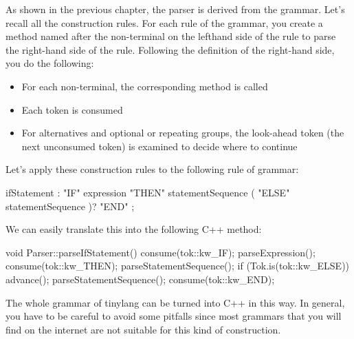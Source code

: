 As shown in the previous chapter, the parser is derived from the grammar. Let’s recall all the construction rules. For each rule of the grammar, you create a method named after the non-terminal on the lefthand side of the rule to parse the right-hand side of the rule. Following the definition of the right-hand side, you do the following:

\begin{itemize}
\item
For each non-terminal, the corresponding method is called

\item
Each token is consumed

\item
For alternatives and optional or repeating groups, the look-ahead token (the next unconsumed token) is examined to decide where to continue
\end{itemize}

Let’s apply these construction rules to the following rule of grammar:

\begin{shell}
ifStatement
    : "IF" expression "THEN" statementSequence
        ( "ELSE" statementSequence )? "END" ;
\end{shell}

We can easily translate this into the following C++ method:

\begin{cpp}
void Parser::parseIfStatement() {
    consume(tok::kw_IF);
    parseExpression();
    consume(tok::kw_THEN);
    parseStatementSequence();
    if (Tok.is(tok::kw_ELSE)) {
        advance();
        parseStatementSequence();
    }
    consume(tok::kw_END);
}
\end{cpp}

The whole grammar of tinylang can be turned into C++ in this way. In general, you have to be careful to avoid some pitfalls since most grammars that you will find on the internet are not suitable for this kind of construction.

